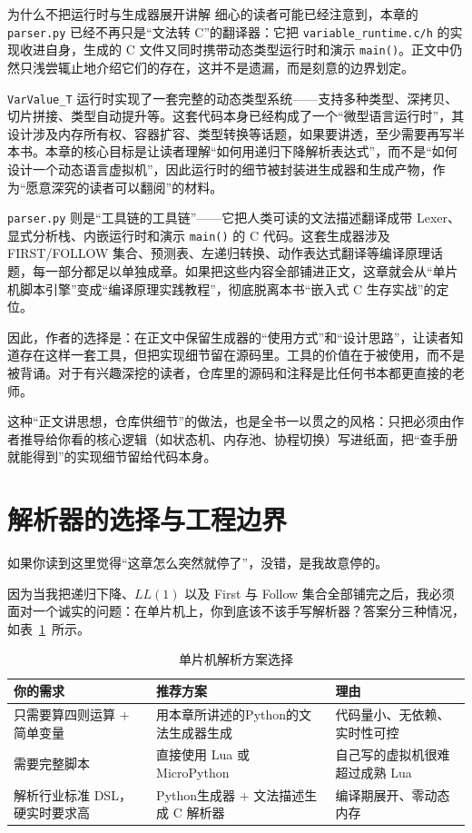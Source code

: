 \begin{anybox}{为什么不把运行时与生成器展开讲解}
	细心的读者可能已经注意到，本章的 \texttt{parser.py} 已经不再只是“文法转 C”的翻译器：它把 \texttt{variable\_runtime.c/h} 的实现收进自身，生成的 C 文件又同时携带动态类型运行时和演示 \texttt{main()}。正文中仍然只浅尝辄止地介绍它们的存在，这并不是遗漏，而是刻意的边界划定。
	
	\texttt{VarValue\_T} 运行时实现了一套完整的动态类型系统——支持多种类型、深拷贝、切片拼接、类型自动提升等。这套代码本身已经构成了一个“微型语言运行时”，其设计涉及内存所有权、容器扩容、类型转换等话题，如果要讲透，至少需要再写半本书。本章的核心目标是让读者理解“如何用递归下降解析表达式”，而不是“如何设计一个动态语言虚拟机”，因此运行时的细节被封装进生成器和生成产物，作为“愿意深究的读者可以翻阅”的材料。
	
	\texttt{parser.py} 则是“工具链的工具链”——它把人类可读的文法描述翻译成带 Lexer、显式分析栈、内嵌运行时和演示 \texttt{main()} 的 C 代码。这套生成器涉及 FIRST/FOLLOW 集合、预测表、左递归转换、动作表达式翻译等编译原理话题，每一部分都足以单独成章。如果把这些内容全部铺进正文，这章就会从“单片机脚本引擎”变成“编译原理实践教程”，彻底脱离本书“嵌入式 C 生存实战”的定位。
	
	因此，作者的选择是：在正文中保留生成器的“使用方式”和“设计思路”，让读者知道存在这样一套工具，但把实现细节留在源码里。工具的价值在于被使用，而不是被背诵。对于有兴趣深挖的读者，仓库里的源码和注释是比任何书本都更直接的老师。
	
	这种“正文讲思想，仓库供细节”的做法，也是全书一以贯之的风格：只把必须由作者推导给你看的核心逻辑（如状态机、内存池、协程切换）写进纸面，把“查手册就能得到”的实现细节留给代码本身。
\end{anybox}

\section{解析器的选择与工程边界}

如果你读到这里觉得“这章怎么突然就停了”，没错，是我故意停的。

因为当我把递归下降、$LL(1)$ 以及 First 与 Follow 集合全部铺完之后，我必须面对一个诚实的问题：在单片机上，你到底该不该手写解析器？答案分三种情况，如表~\ref{tab:parser-decision}~所示。

\begin{table}[htbp]
	\centering
	\small
	\caption{单片机解析方案选择}
	\label{tab:parser-decision}
	\begin{tabularx}{\textwidth}{l X l}   %
		\toprule
		你的需求 & 推荐方案 & 理由 \\
		\midrule
		只需要算四则运算 + 简单变量 & 用本章所讲述的Python的文法生成器生成 & 代码量小、无依赖、实时性可控 \\
		需要完整脚本 & 直接使用 Lua 或 MicroPython & 自己写的虚拟机很难超过成熟 Lua \\
		解析行业标准 DSL，硬实时要求高 & Python生成器 + 文法描述生成 C 解析器 & 编译期展开、零动态内存 \\
		\bottomrule
	\end{tabularx}
\end{table}

